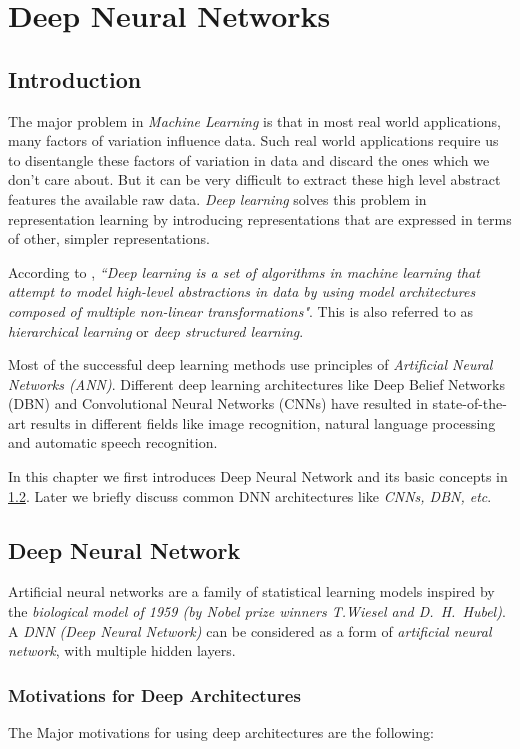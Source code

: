 \chapter{Deep Neural Networks}
\label{chap:dnn}
\section{Introduction}
The major problem in \textit{Machine Learning} is that in most real world applications, many factors of variation influence data.  Such real world applications require us to disentangle these factors of variation in data and discard the ones which we don't care about.  But it can be very difficult to extract these high level abstract features the available raw data.  \textit{Deep learning} solves this problem in representation learning by introducing representations that are expressed in terms of other, simpler representations.

According to \citet{deng2014deep}, \textit{``Deep learning is a set of algorithms in machine learning that attempt to model high-level abstractions in data by using model architectures composed of multiple non-linear transformations"}.  This is also referred to as \textit{hierarchical learning} or \textit{deep structured learning}. 

Most of the successful deep learning methods use principles of \textit{Artificial Neural Networks (ANN)}.  Different deep learning architectures like Deep Belief Networks (DBN) and Convolutional Neural Networks (CNNs) have resulted in state-of-the-art results in different fields like image recognition, natural language processing and automatic speech recognition.

In this chapter we first introduces Deep Neural Network and its basic concepts in \ref{sec:dnn:dnn}.  Later we briefly discuss common DNN architectures like \textit{CNNs, DBN, etc}.

\section{Deep Neural Network}
\label{sec:dnn:dnn}
Artificial neural networks are a family of statistical learning models inspired by the \textit{biological model of 1959 (by Nobel prize winners T.Wiesel and D.~H.~Hubel)}.  A \textit{DNN (Deep Neural Network)} can be considered as a form of \textit{artificial neural network}, with multiple hidden layers. 


\subsection{Motivations for Deep Architectures}
The Major motivations for using deep architectures are the following:


